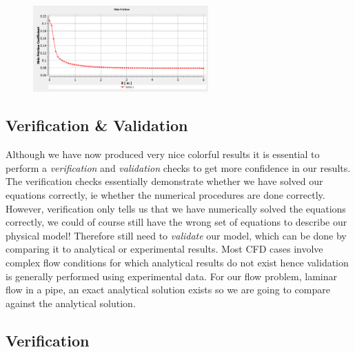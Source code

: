 \documentclass[11pt,a4paper,oneside,hidelinks]{scrartcl}
\begin{document}
\begin{figure}[H]
\begin{center}
\includegraphics[width=0.6\textwidth,clip]{skin_friction_coefficient.png}
\end{center}
\end{figure}


\subsection{Verification \& Validation}

Although we have now produced very nice colorful results it is essential to perform a \emph{verification} and \emph{validation} checks to get more confidence in our results. The verification checks essentially demonstrate whether we have solved our equations correctly, ie whether the numerical procedures are done correctly. However, verification  only tells us that we have numerically solved the equations correctly, we could of course still have the wrong set of equations to describe our physical model! Therefore still need to \emph{validate} our model, which can be done by comparing it to analytical or experimental results. Most CFD cases involve complex flow conditions for which analytical results do not exist hence validation is generally performed using experimental data. For our flow problem, laminar flow in a pipe, an exact analytical solution exists so we are going to compare against the analytical solution.


\subsection{Verification}
\end{document}
